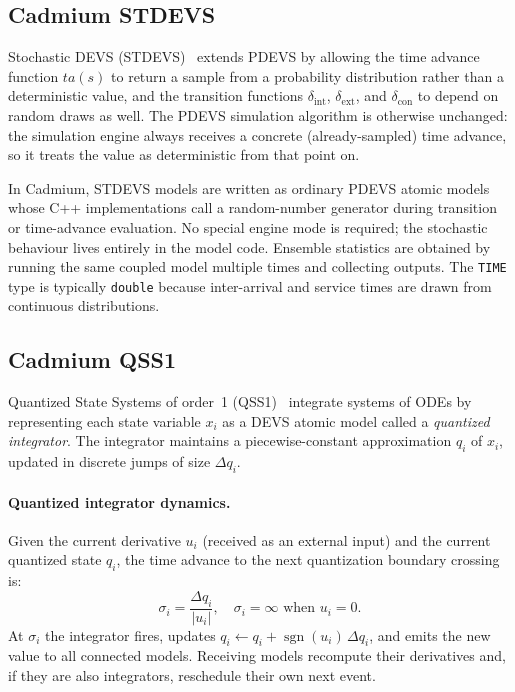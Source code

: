 \subsection*{Cadmium STDEVS}

Stochastic DEVS (STDEVS)~\cite{CKW10} extends PDEVS by allowing the time
advance function $ta(s)$ to return a sample from a probability distribution
rather than a deterministic value, and the transition functions
$\delta_{\text{int}}$, $\delta_{\text{ext}}$, and $\delta_{\text{con}}$ to
depend on random draws as well.  The PDEVS simulation algorithm is
otherwise unchanged: the simulation engine always receives a concrete
(already-sampled) time advance, so it treats the value as deterministic
from that point on.

In Cadmium, STDEVS models are written as ordinary PDEVS atomic models
whose C++ implementations call a random-number generator during
transition or time-advance evaluation.  No special engine mode is
required; the stochastic behaviour lives entirely in the model code.
Ensemble statistics are obtained by running the same coupled model
multiple times and collecting outputs.  The \texttt{TIME} type is
typically \texttt{double} because inter-arrival and service times are
drawn from continuous distributions.

\subsection*{Cadmium QSS1}

Quantized State Systems of order~1 (QSS1)~\cite{K04} integrate systems of
ODEs by representing each state variable $x_i$ as a DEVS atomic model
called a \emph{quantized integrator}.  The integrator maintains a
piecewise-constant approximation $q_i$ of $x_i$, updated in discrete
jumps of size $\Delta q_i$.

\paragraph{Quantized integrator dynamics.}
Given the current derivative $u_i$ (received as an external input) and the
current quantized state $q_i$, the time advance to the next quantization
boundary crossing is:
\[
  \sigma_i = \frac{\Delta q_i}{\lvert u_i \rvert}, \quad
  \sigma_i = \infty \text{ when } u_i = 0.
\]
At $\sigma_i$ the integrator fires, updates $q_i \leftarrow q_i +
\operatorname{sgn}(u_i)\,\Delta q_i$, and emits the new value to all
connected models.  Receiving models recompute their derivatives and, if
they are also integrators, reschedule their own next event.

